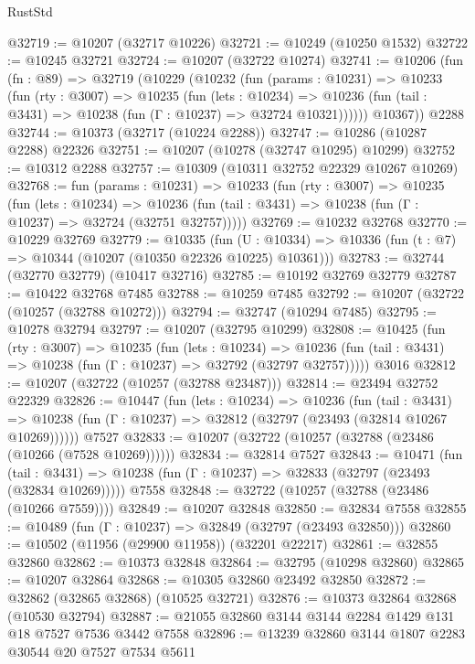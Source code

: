 \begin{lexlean}{RustStd}
\begin{coremodule}
@32719 := @10207 (@32717 @10226)
@32721 := @10249 (@10250 @1532)
@32722 := @10245 @32721
@32724 := @10207 (@32722 @10274)
@32741 := @10206
    (fun (fn : @89) =>
    @32719
      (@10229
        (@10232
          (fun (params : @10231) =>
          @10233
            (fun (rty : @3007) =>
            @10235
              (fun (lets : @10234) =>
              @10236 (fun (tail : @3431) => @10238 (fun (Γ : @10237) => @32724 @10321))))))
        @10367))
    @2288
@32744 := @10373 (@32717 (@10224 @2288))
@32747 := @10286 (@10287 @2288) @22326
@32751 := @10207 (@10278 (@32747 @10295) @10299)
@32752 := @10312 @2288
@32757 := @10309 (@10311 @32752 @22329 @10267 @10269)
@32768 := fun (params : @10231) =>
  @10233
    (fun (rty : @3007) =>
    @10235
      (fun (lets : @10234) =>
      @10236 (fun (tail : @3431) => @10238 (fun (Γ : @10237) => @32724 (@32751 @32757)))))
@32769 := @10232 @32768
@32770 := @10229 @32769
@32779 := @10335
    (fun (U : @10334) => @10336 (fun (t : @7) => @10344 (@10207 (@10350 @22326 @10225) @10361)))
@32783 := @32744 (@32770 @32779) (@10417 @32716)
@32785 := @10192 @32769 @32779
@32787 := @10422 @32768 @7485
@32788 := @10259 @7485
@32792 := @10207 (@32722 (@10257 (@32788 @10272)))
@32794 := @32747 (@10294 @7485)
@32795 := @10278 @32794
@32797 := @10207 (@32795 @10299)
@32808 := @10425
    (fun (rty : @3007) =>
    @10235
      (fun (lets : @10234) =>
      @10236 (fun (tail : @3431) => @10238 (fun (Γ : @10237) => @32792 (@32797 @32757)))))
    @3016
@32812 := @10207 (@32722 (@10257 (@32788 @23487)))
@32814 := @23494 @32752 @22329
@32826 := @10447
    (fun (lets : @10234) =>
    @10236
      (fun (tail : @3431) =>
      @10238 (fun (Γ : @10237) => @32812 (@32797 (@23493 (@32814 @10267 @10269))))))
    @7527
@32833 := @10207 (@32722 (@10257 (@32788 (@23486 (@10266 (@7528 @10269))))))
@32834 := @32814 @7527
@32843 := @10471
    (fun (tail : @3431) => @10238 (fun (Γ : @10237) => @32833 (@32797 (@23493 (@32834 @10269)))))
    @7558
@32848 := @32722 (@10257 (@32788 (@23486 (@10266 @7559))))
@32849 := @10207 @32848
@32850 := @32834 @7558
@32855 := @10489 (fun (Γ : @10237) => @32849 (@32797 (@23493 @32850)))
@32860 := @10502 (@11956 (@29900 @11958)) (@32201 @22217)
@32861 := @32855 @32860
@32862 := @10373 @32848
@32864 := @32795 (@10298 @32860)
@32865 := @10207 @32864
@32868 := @10305 @32860 @23492 @32850
@32872 := @32862 (@32865 @32868) (@10525 @32721)
@32876 := @10373 @32864 @32868 (@10530 @32794)
@32887 := @21055 @32860 @3144 @3144 @2284 @1429 @131 @18 @7527 @7536 @3442 @7558
@32896 := @13239 @32860 @3144 @1807 @2283 @30544 @20 @7527 @7534 @5611

\end{coremodule}
\end{lexlean}
